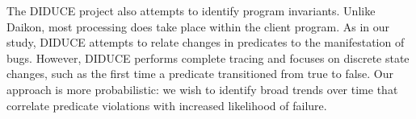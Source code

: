 The DIDUCE project \cite{Hangal:DIDUCE:2002} also attempts to identify
program invariants.  Unlike Daikon, most processing does take place
within the client program.  As in our study, DIDUCE attempts to relate
changes in predicates to the manifestation of bugs.  However, DIDUCE
performs complete tracing and focuses on discrete state changes, such
as the first time a predicate transitioned from true to false.  Our
approach is more probabilistic: we wish to identify broad trends over
time that correlate predicate violations with increased likelihood of
failure.  


